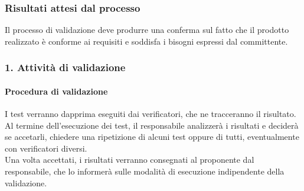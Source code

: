 \subsubsection{Risultati attesi dal processo}
Il processo di validazione deve produrre una conferma sul fatto che il prodotto realizzato è conforme ai requisiti e soddisfa i bisogni espressi dal committente.

\subsubsection{1. Attività di validazione}
\paragraph*{Procedura di validazione}
I test verranno dapprima eseguiti dai verificatori, che ne tracceranno il risultato. Al termine dell'esecuzione dei test, il responsabile analizzerà i risultati e deciderà se accetarli, chiedere una ripetizione di alcuni test oppure di tutti, eventualmente con verificatori diversi. \\
Una volta accettati, i risultati verranno consegnati al proponente dal responsabile, che lo informerà sulle modalità di esecuzione indipendente della validazione.
